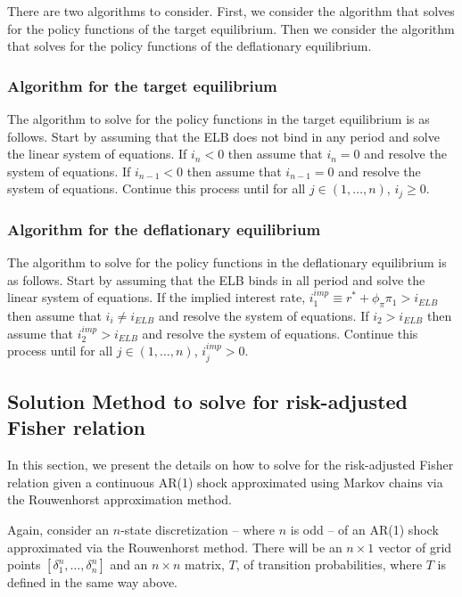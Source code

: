 \documentclass[11pt]{article}
\begin{document}
\begin{singlespace}
		There are two algorithms to consider. First, we consider the algorithm that solves for the policy functions of the target equilibrium. Then we consider the algorithm that solves for the policy functions of the deflationary equilibrium.
		
		\subsubsection{Algorithm for the target equilibrium}
		The algorithm to solve for the policy functions in the target equilibrium is as follows. Start by assuming that the ELB does not bind in any period and solve the linear system of equations. If $i_n < 0$ then assume that $i_n = 0$ and resolve the system of equations. If $i_{n-1} < 0$ then assume that $i_{n-1} = 0$ and resolve the system of equations. Continue this process until for all $j\in(1,\dots,n)$, $i_j \ge 0$. 
		
		\subsubsection{Algorithm for the deflationary equilibrium}
		The algorithm to solve for the policy functions in the deflationary equilibrium is as follows. Start by assuming that the ELB binds in all period and solve the linear system of equations. If the implied interest rate, $i_1^{imp} \equiv r^*  + \phi_{\pi}\pi_1 > i_{ELB}$ then assume that $i_i \ne i_{ELB}$ and resolve the system of equations. If $i_{2} > i_{ELB}$ then assume that $i_2^{imp} > i_{ELB}$ and resolve the system of equations. Continue this process until for all $j\in(1,\dots,n)$, $i_j^{imp} > 0$. 
		
		\subsection{Solution Method to solve for risk-adjusted Fisher relation}
		
		In this section, we present the details on how to solve for the risk-adjusted Fisher relation given a continuous AR(1) shock approximated using Markov chains via the Rouwenhorst approximation method. 
		
		Again, consider an $n$-state discretization -- where $n$ is odd -- of an AR(1) shock approximated via the Rouwenhorst method. There will be an $n \times 1$ vector of grid points $[\delta_1^n,\dots,\delta_n^n]$ and an $n \times n$ matrix, $T$, of transition probabilities, where $T$ is defined in the same way above. 
		

\end{singlespace}
\end{document}
